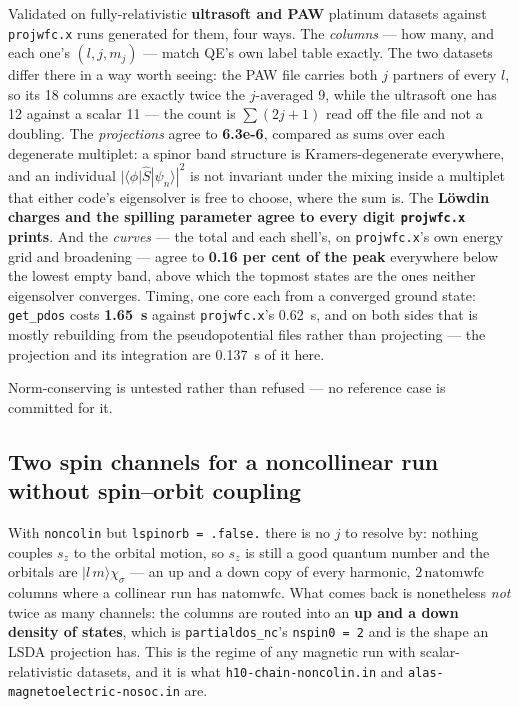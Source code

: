 \documentclass[11pt,a4paper]{article}
\newcommand{\code}[1]{\texttt{\small #1}}
\begin{document}
Validated on fully-relativistic \textbf{ultrasoft and PAW} platinum datasets
against \code{projwfc.x} runs generated for them, four ways. The \emph{columns} --- how
many, and each one's $(l, j, m_j)$ --- match QE's own label table exactly. The
two datasets differ there in a way worth seeing: the PAW file carries both $j$
partners of every $l$, so its 18 columns are exactly twice the $j$-averaged 9,
while the ultrasoft one has 12 against a scalar 11 --- the count is
$\sum (2j + 1)$ read off the file and not a doubling. The \emph{projections}
agree to
\textbf{6.3e-6}, compared as sums over each degenerate multiplet: a spinor band
structure is Kramers-degenerate everywhere, and an individual
$|\langle\phi|\hat S|\psi_n\rangle|^2$ is not invariant under the mixing inside
a multiplet that either code's eigensolver is free to choose, where the sum is.
The \textbf{Löwdin charges and the spilling parameter agree to every digit
\code{projwfc.x} prints}. And the \emph{curves} --- the total and each shell's,
on \code{projwfc.x}'s own energy grid and broadening --- agree to \textbf{0.16
per cent of the peak} everywhere below the lowest empty band, above which the
topmost states are the ones neither eigensolver converges. Timing, one core each from a converged ground state:
\code{get\_pdos} costs \textbf{1.65~s} against \code{projwfc.x}'s 0.62~s, and
on both sides that is mostly rebuilding from the pseudopotential files rather
than projecting --- the projection and its integration are 0.137~s of it here.

Norm-conserving is untested rather than refused --- no reference case is
committed for it.

\subsection*{Two spin channels for a noncollinear run without spin--orbit coupling}

With \code{noncolin} but \code{lspinorb = .false.} there is no $j$ to resolve
by: nothing couples $s_z$ to the orbital motion, so $s_z$ is still a good
quantum number and the orbitals are $|l\,m\rangle\chi_\sigma$ --- an up and a
down copy of every harmonic, $2\,\mathrm{natomwfc}$ columns where a collinear
run has $\mathrm{natomwfc}$. What comes back is nonetheless \emph{not} twice as
many channels: the columns are routed into an \textbf{up and a down density of
states}, which is \code{partialdos\_nc}'s \code{nspin0 = 2} and is the shape an
LSDA projection has. This is the regime of any magnetic run with
scalar-relativistic datasets, and it is what \code{h10-chain-noncolin.in} and
\code{alas-magnetoelectric-nosoc.in} are.
\end{document}
